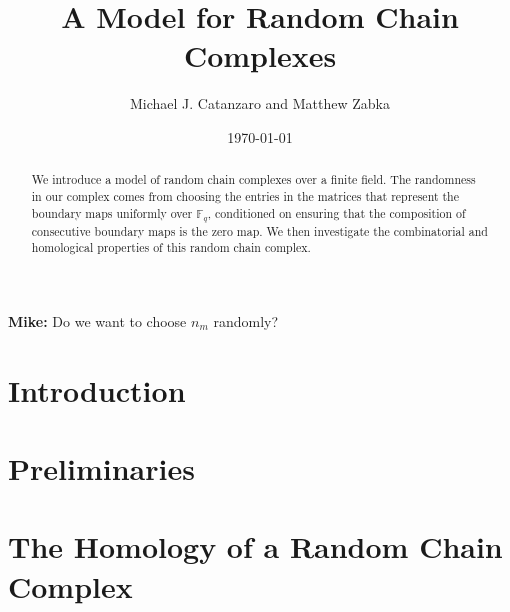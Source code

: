 \documentclass{amsart}
\title{A Model for Random Chain Complexes}
\author{Michael J. Catanzaro and Matthew Zabka}
\date{\today}
\newcommand\mc[1]{\textcolor{NavyBlue}{\textbf{Mike: }#1}}
\begin{document}
\begin{abstract}
We introduce a model of random chain complexes over a finite
field. The randomness in our complex comes from choosing the entries in the
matrices that represent the boundary maps uniformly over $\mathbb{F}_q$,
conditioned on ensuring that the composition of consecutive boundary maps is
the zero map.  We then investigate the combinatorial and homological 
properties of this random chain complex.
\end{abstract}
\maketitle


\mc{Do we want to choose $n_m$ randomly?}
\section{Introduction}

\section{Preliminaries}

\section{The Homology of a Random Chain Complex}\label{SecCondComp}

%


  
\end{document}
